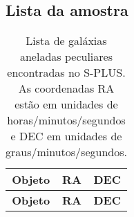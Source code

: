 \begin{apendicesenv}

    \chapter{Lista da amostra} \label{apendice:lista_amostra}

    \captionsetup{justification=justified}

        \begin{longtable}{|c|c|c|}
        \caption{Lista de galáxias aneladas peculiares encontradas no S-PLUS. As coordenadas RA estão em unidades de horas/minutos/segundos e DEC em unidades de graus/minutos/segundos.} \label{tab:splus} \\
            \hline
            \textbf{Objeto} & \textbf{RA} & \textbf{DEC} \\ 
            \hline
            \endfirsthead
            
            \hline
            \textbf{Objeto} & \textbf{RA} & \textbf{DEC} \\ 
            \hline
            \endhead


\end{longtable}
\end{apendicesenv}
